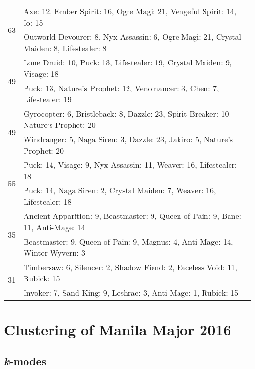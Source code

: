 \documentclass[result.tex]{subfiles}
\begin{document}
\begin{table}[H]
\begin{tabular}{ | c | p{12.5cm} | }
\hline
\multirow{2}{*}{63}
& Axe: 12, Ember Spirit: 16, Ogre Magi: 21, Vengeful Spirit: 14, Io: 15 \\
& Outworld Devourer: 8, Nyx Assassin: 6, Ogre Magi: 21, Crystal Maiden: 8, Lifestealer: 8 \\
\hline
\multirow{2}{*}{49}
& Lone Druid: 10, Puck: 13, Lifestealer: 19, Crystal Maiden: 9, Visage: 18 \\
& Puck: 13, Nature's Prophet: 12, Venomancer: 3, Chen: 7, Lifestealer: 19 \\
\hline
\multirow{2}{*}{49}
& Gyrocopter: 6, Bristleback: 8, Dazzle: 23, Spirit Breaker: 10, Nature's Prophet: 20 \\
& Windranger: 5, Naga Siren: 3, Dazzle: 23, Jakiro: 5, Nature's Prophet: 20 \\
\hline
\multirow{2}{*}{55}
& Puck: 14, Visage: 9, Nyx Assassin: 11, Weaver: 16, Lifestealer: 18 \\
& Puck: 14, Naga Siren: 2, Crystal Maiden: 7, Weaver: 16, Lifestealer: 18 \\
\hline
\multirow{2}{*}{35}
& Ancient Apparition: 9, Beastmaster: 9, Queen of Pain: 9, Bane: 11, Anti-Mage: 14 \\
& Beastmaster: 9, Queen of Pain: 9, Magnus: 4, Anti-Mage: 14, Winter Wyvern: 3 \\
\hline
\multirow{2}{*}{31}
& Timbersaw: 6, Silencer: 2, Shadow Fiend: 2, Faceless Void: 11, Rubick: 15 \\
& Invoker: 7, Sand King: 9, Leshrac: 3, Anti-Mage: 1, Rubick: 15 \\
\hline
    \end{tabular}
    \caption{}
    \label{}
    \end{table}

\clearpage
\section*{Clustering of Manila Major 2016}

\subsection*{\textit{k}-modes}
\end{document}
